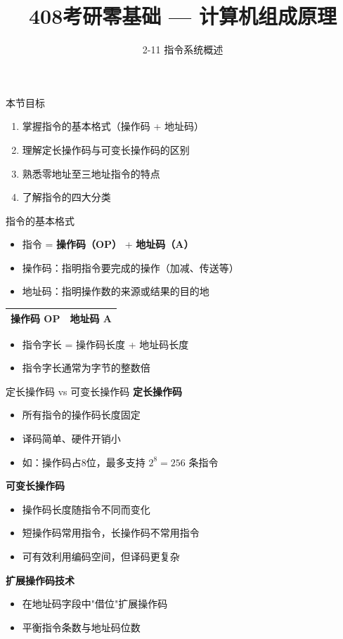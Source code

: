 \documentclass[10pt, aspectratio=169]{beamer}
\title{408考研零基础 --- 计算机组成原理}
\subtitle{2-11 指令系统概述}
\author{}
\date{}
\begin{document}
\begin{frame}{本节目标}
    \begin{enumerate}
        \item 掌握指令的基本格式（操作码 + 地址码）
        \item 理解定长操作码与可变长操作码的区别
        \item 熟悉零地址至三地址指令的特点
        \item 了解指令的四大分类
    \end{enumerate}
\end{frame}

\begin{frame}{指令的基本格式}
    \begin{itemize}
        \item 指令 = \textbf{操作码（OP）} + \textbf{地址码（A）}
        \item 操作码：指明指令要完成的操作（加减、传送等）
        \item 地址码：指明操作数的来源或结果的目的地
    \end{itemize}
    \vspace{0.5em}
    \begin{center}
        \begin{tabular}{|c|c|}
            \hline
            \textbf{操作码 OP} & \textbf{地址码 A} \\
            \hline
        \end{tabular}
    \end{center}
    \vspace{0.5em}
    \begin{itemize}
        \item 指令字长 = 操作码长度 + 地址码长度
        \item 指令字长通常为字节的整数倍
    \end{itemize}
\end{frame}

\begin{frame}[fragile]{定长操作码 vs 可变长操作码}
    \textbf{定长操作码}
    \begin{itemize}
        \item 所有指令的操作码长度固定
        \item 译码简单、硬件开销小
        \item 如：操作码占8位，最多支持 $2^8 = 256$ 条指令
    \end{itemize}
    \vspace{0.5em}
    \textbf{可变长操作码}
    \begin{itemize}
        \item 操作码长度随指令不同而变化
        \item 短操作码常用指令，长操作码不常用指令
        \item 可有效利用编码空间，但译码更复杂
    \end{itemize}
    \vspace{0.5em}
    \textbf{扩展操作码技术}
    \begin{itemize}
        \item 在地址码字段中"借位"扩展操作码
        \item 平衡指令条数与地址码位数
    \end{itemize}
\end{frame}
\end{document}
